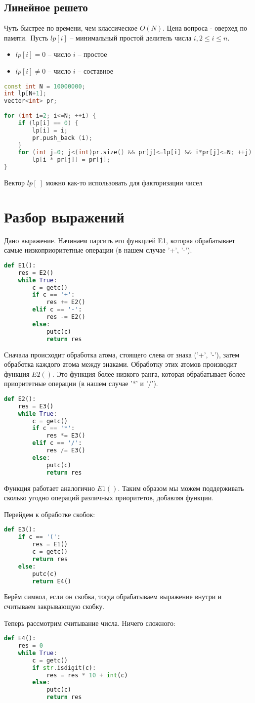 \subsection{Линейное решето}
Чуть быстрее по времени, чем классическое $O (N)$. Цена вопроса - оверхед по памяти.\
Пусть $lp[i]$ -- минимальный простой делитель числа $i, 2\leq i\leq n$. \
\begin{itemize}
\item $lp[i] = 0$ -- число $i$ -- простое
\item $lp[i] \neq 0$ -- число $i$ -- составное
\end{itemize}
\begin{lstlisting}[language=C++]
const int N = 10000000;
int lp[N+1];
vector<int> pr;
 
for (int i=2; i<=N; ++i) {
	if (lp[i] == 0) {
		lp[i] = i;
		pr.push_back (i);
	}
	for (int j=0; j<(int)pr.size() && pr[j]<=lp[i] && i*pr[j]<=N; ++j)
		lp[i * pr[j]] = pr[j];
}
\end{lstlisting}
Вектор $lp[\ ]$ можно как-то использовать для факторизации чисел

\section{Разбор выражений}
Дано выражение. Начинаем парсить его функцией E1, которая обрабатывает самые низкоприоритетные операции (в нашем случае '+', '-').
\begin{lstlisting}[language=Python]
def E1():
	res = E2()
	while True:
		c = getc()
		if c == '+':
			res += E2()
		elif c == '-':
			res -= E2()
		else:
			putc(c)
			return res
\end{lstlisting}
Сначала происходит обработка атома, стоящего слева от знака ('+', '-'), затем обработка каждого атома между знаками. Обработку этих атомов производит функция $E2()$. Это функция более низкого ранга, которая обрабатывает более приоритетные операции (в нашем случае '*' и '/').
\begin{lstlisting}[language=Python]
def E2():
	res = E3()
	while True:
		c = getc()
		if c == '*':
			res *= E3()
		elif c == '/':
			res /= E3()
		else:
			putc(c)
			return res
\end{lstlisting}
Функция работает аналогично $E1()$. Таким образом мы можем поддерживать сколько угодно операций различных приоритетов, добавляя функции.

Перейдем к обработке скобок:
\begin{lstlisting}[language=Python]
def E3():
	if c == '(':
		res = E1()
		c = getc()
		return res
	else:
		putc(c)
		return E4()
\end{lstlisting}
Берём символ, если он скобка, тогда обрабатываем выражение внутри и считываем закрывающую скобку.

Теперь рассмотрим считывание числа. Ничего сложного:
\begin{lstlisting}[language=Python]
def E4():
	res = 0
	while True:
		c = getc()
		if str.isdigit(c):
			res = res * 10 + int(c)
		else:
			putc(c)
			return res
\end{lstlisting}
